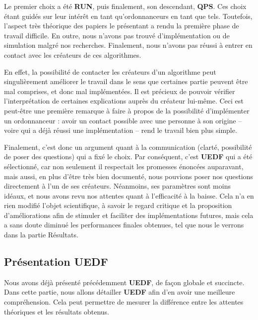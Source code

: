 	Le premier choix a été \textbf{RUN}, puis finalement, son descendant, \textbf{QPS}. Ces choix étant guidés 
	sur leur intérêt en tant qu'ordonnanceurs en tant que tels.
	Toutefois, l'aspect très théorique des papiers le présentant a rendu la première phase de travail difficile. 
	En outre, nous n'avons pas trouvé d'implémentation ou de simulation malgré nos recherches.
	Finalement, nous n'avons pas réussi à entrer en contact avec les créateurs de ces algorithmes. \newline
	
	En effet, la possibilité de contacter les créateurs d'un algorithme peut singulièrement améliorer le 
	travail dans le sens que certaines partie peuvent être mal comprises, et donc mal implémentées. 
	Il est précieux de pouvoir vérifier l'interprétation de certaines explications auprès du 
	créateur lui-même. \newline
	Ceci est peut-être une première remarque à faire à propos de la possibilité d'implémenter 
	un ordonnanceur : avoir un contact possible avec une personne à son origine -- voire qui a déjà 
	réussi une implémentation -- rend le travail bien plus simple. \newline
	
	
	Finalement, c'est donc un argument quant à la communication (clarté, possibilité de poser des questions) 
	qui a fixé le choix. Par conséquent, c'est \textbf{UEDF} qui a été sélectionné, car 
	non seulement il respectait 
	les promesses énoncées auparavant, mais aussi, en plus d'être très bien documenté, 
	 nous pouvions poser nos questions directement à l'un de ses créateurs. Néanmoins, ses paramètres sont moins idéaux, 
	et nous avons revu nos attentes quant à l'efficacité à la baisse. Cela n'a en rien 
	modifié l'objet scientifique, à savoir le regard critique et la proposition d'améliorations 
	afin de stimuler et faciliter des implémentations futures, mais cela a sans doute 
	diminué les performances finales obtenues, tel que nous le verrons dans la partie Résultats.\newline
	
	
	\subsection{Présentation UEDF}
	
	Nous avons déjà présenté précédemment \textbf{UEDF}, de façon globale et succincte. 
	Dans cette partie, nous allons détailler \textbf{UEDF} afin d'en avoir une meilleure compréhension. Cela peut 
	permettre de mesurer la différence entre les attentes théoriques et les résultats obtenus.\newline

